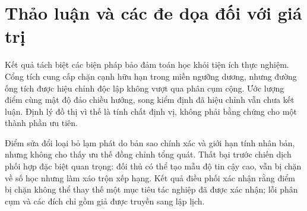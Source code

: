 \documentclass[runningheads]{llncs}
\begin{document}
\begin{table}[t]
\centering\scriptsize
\caption{Độ nhạy từng biến một của NDCG@5 trung bình đối với các hằng số
heuristic Candidate-4.1. Mỗi khoảng là min--max trung bình trên các mức đã
thử, gồm cả mức tham chiếu, trên 40 seed kiểm thử. Mọi độ rộng đều dưới 0.01.}
\label{tab:sensitivity}
\end{table}

\section{Thảo luận và các đe dọa đối với giá trị}

Kết quả tách biệt các biện pháp bảo đảm toán học khỏi tiện ích thực nghiệm.
Cổng tích cung cấp chặn cạnh hữu hạn trong miền ngưỡng dương, nhưng đường
ống tích được hiệu chỉnh độc lập không vượt qua phân cụm cộng. Ước lượng điểm
cùng mật độ đảo chiều hướng, song kiểm định đã hiệu chỉnh vẫn chưa kết luận.
Định lý đồ thị vì thế là tính chất định vị, không phải bằng chứng cho một
thành phần ưu tiên.

Điểm sửa đổi loại bỏ lạm phát do bản sao chính xác và giới hạn tính nhân bản,
nhưng không cho thấy ưu thế đồng chỉnh tổng quát. Thất bại trước chiến dịch
phối hợp đặc biệt quan trọng: đối thủ có thể tạo mẫu độ tin cậy cao, vẫn bị
chặn về số học nhưng làm xáo trộn xếp hạng. Kết quả điều phối xác nhận rằng
điểm bị chặn không thể thay thế một mục tiêu tác nghiệp đã được xác nhận; lỗi
phân cụm và các đích chỉ gồm giả được truyền sang lập lịch.
\end{document}
